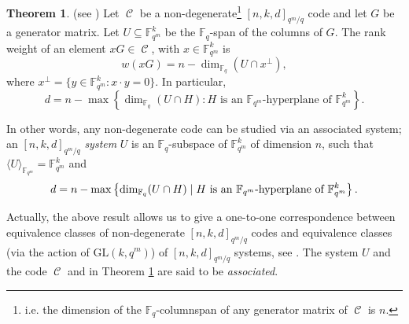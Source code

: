 \documentclass[11pt]{amsart}
\DeclareMathOperator{\C}{\mathcal{C}}
\theoremstyle{definition}
\newtheorem{theorem}{Theorem}[section]
\newcommand{\F}{{\mathbb F}}
\newcommand{\fq}{{\mathbb F}_{q}}
\begin{document}
\begin{theorem}(see \cite{Randrianarisoa2020ageometric}) \label{th:connection}
Let $\C$ be a non-degenerate\footnote{i.e. the dimension of the $\fq$-columnspan of any generator matrix of $\C$ is $n$.} $[n,k,d]_{q^m/q}$ code and let $G$ be a generator matrix.
Let $U \subseteq \F_{q^m}^k$ be the $\F_q$-span of the columns of $G$.
The rank weight of an element $x G \in \C$, with $x \in \F_{q^m}^k$ is
\begin{equation}\label{eq:relweight}
w(x G) = n - \dim_{\fq}(U \cap x^{\perp}),\end{equation}
where $x^{\perp}=\{y \in \F_{q^m}^k \colon x \cdot y=0\}.$ In particular,
\begin{equation} \label{eq:distancedesign}
d=n - \max\left\{ \dim_{\fq}(U \cap H)  \colon H\mbox{ is an } \F_{q^m}\mbox{-hyperplane of }\F_{q^m}^k  \right\}.
\end{equation}
\end{theorem}

In other words, any non-degenerate code can be studied via an associated system; an $[n,k,d]_{q^m/q}$ \emph{system} $U$ is an $\F_q$-subspace of $\F_{q^m}^k$ of dimension $n$, such that
$ \langle U \rangle_{\F_{q^m}}=\F_{q^m}^k$ and
$$ d=n-\max\left\{\dim_{\F_q}(U\cap H) \mid H \textnormal{ is an $\F_{q^m}$-hyperplane of }\F_{q^m}^k\right\}.$$

Actually, the above result allows us to give a one-to-one correspondence between equivalence classes of non-degenerate $[n,k,d]_{q^m/q}$ codes and equivalence classes (via the action of $\mathrm{GL}(k,q^m)$) of $[n,k,d]_{q^m/q}$ systems, see \cite{Randrianarisoa2020ageometric}.
The system $U$ and the code $\C$ and in Theorem \ref{th:connection} are said to be \emph{associated}.

\end{document}
